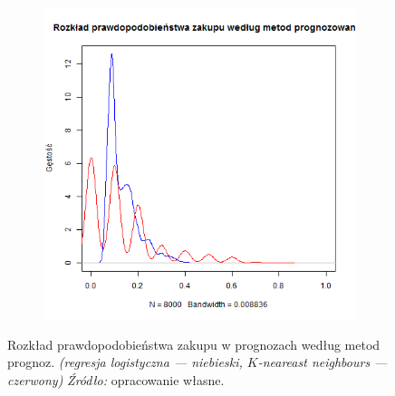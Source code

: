 \documentclass[polish, twoside, 12pt, a4paper]{article}
\theoremstyle{definition}
\theoremstyle{plain}
\theoremstyle{remark}
\begin{document}
\begin{figure}[hbt]
  \centering

  \begin{subfigure}[t]{0.8\textwidth}
    \includegraphics[width=\textwidth]{pictures/rozklad_prognoz}
  \end{subfigure}
  \captionsetup{margin=10pt,font=small,labelfont=bf,width=.8\textwidth}

  \caption[Rozkład prawdopodobieństwa zakupu w prognozach]{Rozkład prawdopodobieństwa zakupu w prognozach według metod prognoz. \textit{(regresja logistyczna --- niebieski, $K$-neareast neighbours --- czerwony)} \textit{Źródło:} opracowanie własne.}\label{fig:rozklad_lg_kn}
\end{figure}
\end{document}
